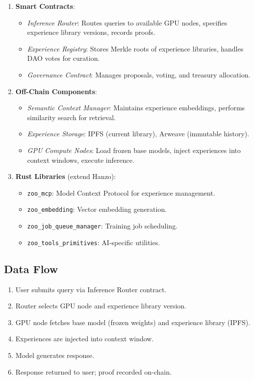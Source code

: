 \documentclass[11pt,a4paper]{article}
\begin{document}
\begin{enumerate}[leftmargin=*]
\item \textbf{Smart Contracts}:
   \begin{itemize}
   \item \textit{Inference Router}: Routes queries to available GPU nodes, specifies experience library versions, records proofs.
   \item \textit{Experience Registry}: Stores Merkle roots of experience libraries, handles DAO votes for curation.
   \item \textit{Governance Contract}: Manages proposals, voting, and treasury allocation.
   \end{itemize}

\item \textbf{Off-Chain Components}:
   \begin{itemize}
   \item \textit{Semantic Context Manager}: Maintains experience embeddings, performs similarity search for retrieval.
   \item \textit{Experience Storage}: IPFS (current library), Arweave (immutable history).
   \item \textit{GPU Compute Nodes}: Load frozen base models, inject experiences into context windows, execute inference.
   \end{itemize}

\item \textbf{Rust Libraries} (extend Hanzo):
   \begin{itemize}
   \item \texttt{zoo\_mcp}: Model Context Protocol for experience management.
   \item \texttt{zoo\_embedding}: Vector embedding generation.
   \item \texttt{zoo\_job\_queue\_manager}: Training job scheduling.
   \item \texttt{zoo\_tools\_primitives}: AI-specific utilities.
   \end{itemize}
\end{enumerate}

\subsection{Data Flow}

\begin{enumerate}
\item User submits query via Inference Router contract.
\item Router selects GPU node and experience library version.
\item GPU node fetches base model (frozen weights) and experience library (IPFS).
\item Experiences are injected into context window.
\item Model generates response.
\item Response returned to user; proof recorded on-chain.
\end{enumerate}
\end{document}
